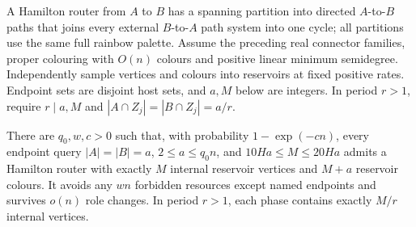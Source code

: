 A Hamilton router from $A$ to $B$ has a spanning partition into directed $A$-to-$B$ paths that joins every external $B$-to-$A$ path system into one cycle; all partitions use the same full rainbow palette. Assume the preceding real connector families, proper colouring with $O(n)$ colours and positive linear minimum semidegree. Independently sample vertices and colours into reservoirs at fixed positive rates. Endpoint sets are disjoint host sets, and $a,M$ below are integers. In period $r>1$, require $r\mid{}a,M$ and $|A\cap{}Z_j|=|B\cap{}Z_j|=a/r$.

\begin{lemma}\label{rt:thm:router}\label{sg:lem:router}\label{period:mixed-router}
There are $q_0,w,c>0$ such that, with probability $1-\exp(-cn)$, every endpoint query $|A|=|B|=a$, $2\le{}a\le{}q_0n$, and $10Ha\le{}M\le20Ha$ admits a Hamilton router with exactly $M$ internal reservoir vertices and $M+a$ reservoir colours. It avoids any $wn$ forbidden resources except named endpoints and survives $o(n)$ role changes. In period $r>1$, each phase contains exactly $M/r$ internal vertices.
\end{lemma}
